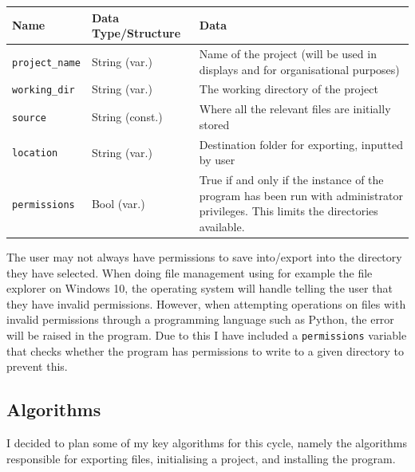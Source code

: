 \documentclass[11pt]{article}
\begin{document}
            \begin{table}[!ht]
            \begin{center}
                \begin{tabular}{llm{}}
                Name & Data Type/Structure & Data \\ \hline
                \verb|project_name| & String (var.) & Name of the project (will be used in displays and for organisational purposes) \\
                \verb|working_dir| & String (var.) & The working directory of the project \\
                \verb|source| & String (const.) & Where all the relevant files are initially stored \\
                \verb|location| & String (var.) & Destination folder for exporting, inputted by user \\
                \verb|permissions| & Bool (var.) & True if and only if the instance of the program has been run with administrator privileges. This limits the directories available.
                \end{tabular}
            \end{center}
            \end{table}

            The user may not always have permissions to save into/export into the directory they have selected. When doing file management using for example the file explorer on Windows 10, the operating system will handle telling the user that they have invalid permissions. However, when attempting operations on files with invalid permissions through a programming language such as Python, the error will be raised in the program. Due to this I have included a \verb|permissions| variable that checks whether the program has permissions to write to a given directory to prevent this.

            \pagebreak
        \subsection{Algorithms}
            I decided to plan some of my key algorithms for this cycle, namely the algorithms responsible for exporting files, initialising a project, and installing the program. 
            
\end{document}
